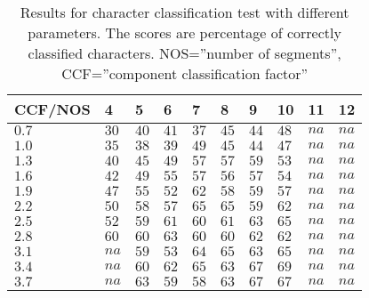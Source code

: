 \begin{table}[htb]
  \begin{center}
  \begin{tabular}{ l | l l l l l l l l l }
    CCF/NOS & 4   & 5    & 6    & 7    & 8    & 9    & 10   & 11 & 12 \\ \hline
    $0.7$  & $30$ & $40$ & $41$ & $37$ & $45$ & $44$ & $48$ & $na$ & $na$\\ 
    $1.0$  & $35$ & $38$ & $39$ & $49$ & $45$ & $44$ & $47$ & $na$ & $na$\\ 
    $1.3$  & $40$ & $45$ & $49$ & $57$ & $57$ & $59$ & $53$ & $na$ & $na$\\
    $1.6$  & $42$ & $49$ & $55$ & $57$ & $56$ & $57$ & $54$ & $na$ & $na$\\   
    $1.9$  & $47$ & $55$ & $52$ & $62$ & $58$ & $59$ & $57$ & $na$ & $na$\\  
    $2.2$  & $50$ & $58$ & $57$ & $65$ & $65$ & $59$ & $62$ & $na$ & $na$\\ 
    $2.5$  & $52$ & $59$ & $61$ & $60$ & $61$ & $63$ & $65$ & $na$ & $na$\\ 
    $2.8$  & $60$ & $60$ & $63$ & $60$ & $60$ & $62$ & $62$ & $na$ & $na$\\ 
    $3.1$  & $na$ & $59$ & $53$ & $64$ & $65$ & $63$ & $65$ & $na$ & $na$\\ 
    $3.4$  & $na$ & $60$ & $62$ & $65$ & $63$ & $67$ & $69$ & $na$ & $na$\\ 
    $3.7$  & $na$ & $63$ & $59$ & $58$ & $63$ & $67$ & $67$ & $na$ & $na$\\ 
  \end{tabular}
\end{center}
\caption{Results for character classification test with different parameters. The scores are percentage of correctly classified characters.
	 NOS=''number of segments'',
         CCF=''component classification factor''}
\label{tab:word_classifier_results_generated_data} 
\end{table}
